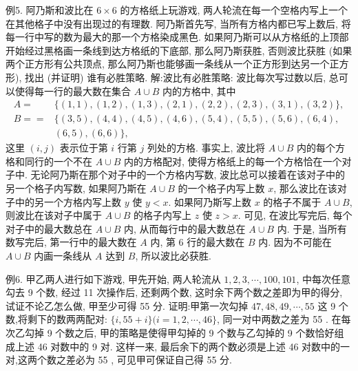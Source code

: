 例5. 阿乃斯和波比在 $6 \times 6$ 的方格纸上玩游戏, 两人轮流在每一个空格内写上一个在其他格子中没有出现过的有理数.
阿乃斯首先写, 当所有方格内都已写上数后, 将每一行中写的数为最大的那一个方格染成黑色.
如果阿乃斯可以从方格纸的上顶部开始经过黑格画一条线到达方格纸的下底部, 那么阿乃斯获胜, 否则波比获胜 (如果两个正方形有公共顶点, 那么阿乃斯也能够画一条线从一个正方形到达另一个正方形), 找出 (并证明) 谁有必胜策略.
解:波比有必胜策略: 波比每次写过数以后, 总可以使得每一行的最大数在集合 $A \cup B$ 内的方格中, 其中
$$
\begin{aligned}
A= & \{(1,1),(1,2),(1,3),(2,1),(2,2),(2,3),(3,1),(3,2)\}, \\
B== & \{(3,5),(4,4),(4,5),(4,6),(5,4),(5,5),(5,6),(6,4), \\
& (6,5),(6,6)\},
\end{aligned}
$$
这里 $(i, j)$ 表示位于第 $i$ 行第 $j$ 列处的方格.
事实上, 波比将 $A \cup B$ 内的每个方格和同行的一个不在 $A \cup B$ 内的方格配对, 使得方格纸上的每一个方格恰在一个对子中.
无论阿乃斯在那个对子中的一个方格内写数, 波比总可以接着在该对子中的另一个格子内写数, 如果阿乃斯在 $A \cup B$ 的一个格子内写上数 $x$, 那么波比在该对子中的另一个方格内写上数 $y$ 使 $y<x$. 如果阿乃斯写上数 $x$ 的格子不属于 $A \cup B$, 则波比在该对子中属于 $A \cup B$ 的格子内写上 $z$ 使 $z>x$. 可见, 在波比写完后, 每个对子中的最大数总在 $A \cup B$ 内, 从而每行中的最大数总在 $A \cup B$ 内.
于是, 当所有数写完后, 第一行中的最大数在 $A$ 内, 第 6 行的最大数在 $B$ 内.
因为不可能在 $A \cup B$ 内画一条线从 $A$ 达到 $B$, 所以波比必获胜.



例6. 甲乙两人进行如下游戏, 甲先开始, 两人轮流从 $1,2,3, \cdots, 100,101$,
中每次任意勾去 9 个数, 经过 11 次操作后, 还剩两个数, 这时余下两个数之差即为甲的得分, 试证不论乙怎么做, 甲至少可得 55 分.
证明:甲第一次勾掉 $47,48,49, \cdots, 55$ 这 9 个数,将剩下的数两两配对: $\{i, 55+i\}(i=1,2, \cdots, 46\}$, 同一对中两数之差为 55 . 在每次乙勾掉 9 个数之后, 甲的策略是使得甲勾掉的 9 个数与乙勾掉的 9 个数恰好组成上述 46 对数中的 9 对.
这样一来, 最后余下的两个数必须是上述 46 对数中的一对,这两个数之差必为 55 , 可见甲可保证自己得 55 分.



